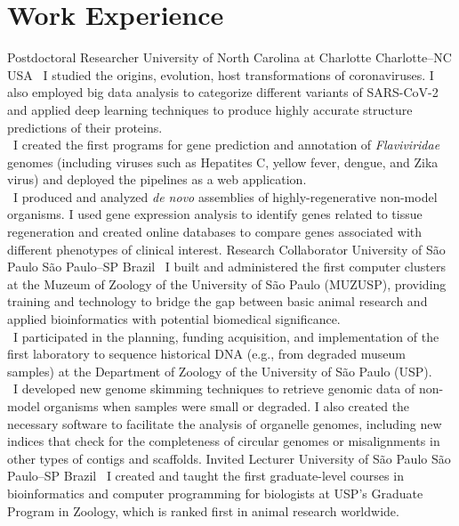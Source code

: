 \documentclass[11pt, letterpaper, roman]{moderncv}
\begin{document}
\section{Work Experience}
    	{Postdoctoral Researcher}
    	{University of North Carolina at Charlotte}
    	{Charlotte--NC}
    	{USA}
    	{
    		\textbullet~I studied the origins, evolution, host transformations of coronaviruses. I also employed big data analysis to categorize different variants of SARS-CoV-2 and applied deep learning techniques to produce highly accurate structure predictions of their proteins.\\
    		\textbullet~I created the first programs for gene prediction and annotation of \textit{Flaviviridae} genomes (including viruses such as Hepatites C, yellow fever, dengue, and Zika virus) and deployed the pipelines as a web application.\\
    		\textbullet~I produced and analyzed \textit{de novo} assemblies of highly-regenerative non-model organisms. I used gene expression analysis to identify genes related to tissue regeneration and created online databases to compare genes associated with different phenotypes of clinical interest.
    	}
    	{Research Collaborator}
    	{University of São Paulo}
    	{São Paulo--SP}
    	{Brazil}
    	{
    		\textbullet~I built and administered the first computer clusters at the Muzeum of Zoology of the University of São Paulo (MUZUSP), providing training and technology to bridge the gap between basic animal research and applied bioinformatics with potential biomedical significance.\\
    		\textbullet~I participated in the planning, funding acquisition, and implementation of the first laboratory to sequence historical DNA (e.g., from degraded museum samples) at the Department of Zoology of the University of São Paulo (USP).\\
    		\textbullet~I developed new genome skimming techniques to retrieve genomic data of non-model organisms when samples were small or degraded. I also created the necessary software to facilitate the analysis of organelle genomes, including new indices that check for the completeness of circular genomes or misalignments in other types of contigs and scaffolds.
    	}
    	{Invited Lecturer}
    	{University of São Paulo}
    	{São Paulo--SP}
    	{Brazil}
    	{
    	    \textbullet~I created and taught the first graduate-level courses in bioinformatics and computer programming for biologists at USP's Graduate Program in Zoology, which is ranked first in animal research worldwide.
    	}
\end{document}
